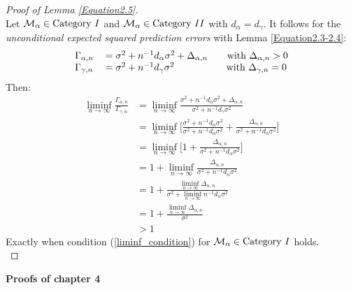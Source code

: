\documentclass[Research_Module_ES.tex]{subfiles}
\begin{document}
\begin{proof}[Proof of Lemma \ref{Equation2.5}]~\\
	Let $\mathcal{M}_\alpha\in\text{Category}~\RM{1}$ and $\mathcal{M}_\alpha\in\text{Category}~\RM{2}$ with $d_\alpha=d_\gamma$. It follows for the \textit{unconditional expected squared prediction errors} with Lemma \ref{Equation2.3-2.4}:
	\begin{align*}
	\begin{tabular}{ll}
	$\Gamma_{\alpha,n}$&$=\sigma^2+n^{-1}d_\alpha\sigma^2+\Delta_{\alpha,n}~~~~~$ with $\Delta_{\alpha,n}>0$\\
	$\Gamma_{\gamma,n}$&$=\sigma^2+n^{-1}d_\gamma\sigma^2~~~~~~~~~~~~~~~~$with $\Delta_{\gamma,n}=0$
	\end{tabular}
	\end{align*}
	Then:
	\begin{align*}
	\liminf_{n\rightarrow\infty}\frac{\Gamma_{\alpha,n}}{\Gamma_{\gamma,n}}&=\liminf_{n\rightarrow\infty}\frac{\sigma^2+n^{-1}d_\alpha\sigma^2+\Delta_{\alpha,n}}{\sigma^2+n^{-1}d_\gamma\sigma^2}	\\
	&=\liminf_{n\rightarrow\infty}\Big[\frac{\sigma^2+n^{-1}d_\alpha\sigma^2}{\sigma^2+n^{-1}d_\alpha\sigma^2}+\frac{\Delta_{\alpha,n}}{\sigma^2+n^{-1}d_\alpha\sigma^2}\Big]\\
	&=\liminf_{n\rightarrow\infty}\Big[1+\frac{\Delta_{\alpha,n}}{\sigma^2+n^{-1}d_\alpha\sigma^2}\Big]\\
	&=1+\liminf_{n\rightarrow\infty}\frac{\Delta_{\alpha,n}}{\sigma^2+n^{-1}d_\alpha\sigma^2}\\
	&=1+\frac{\liminf_{n\rightarrow\infty}\Delta_{\alpha,n}}{\sigma^2+ \liminf_{n\rightarrow\infty} n^{-1}d_\alpha\sigma^2}\\
	&=1+\frac{\liminf_{n\rightarrow\infty}\Delta_{\alpha,n}}{\sigma^2}\\
	&>1
	\end{align*}
	Exactly when condition (\ref{liminf_condition}) for $\mathcal{M}_\alpha\in\text{Category}~\RM{1}$ holds.\\
\end{proof}

\textbf{Proofs of chapter 4}
\end{document}

